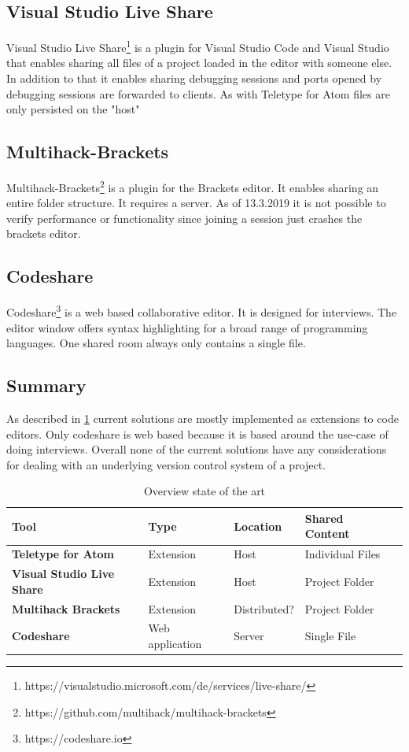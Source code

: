 \subsection{Visual Studio Live Share}
Visual Studio Live Share\footnote{https://visualstudio.microsoft.com/de/services/live-share/}  is a plugin for Visual Studio Code and Visual Studio that enables sharing all files of a project loaded in the editor with someone else. In addition to that it enables sharing debugging sessions and ports opened by debugging sessions are forwarded to clients. As with Teletype for Atom files are only persisted on the "host"  
\subsection{Multihack-Brackets}
Multihack-Brackets\footnote{https://github.com/multihack/multihack-brackets} is a plugin for the Brackets editor. It enables sharing an entire folder structure. It requires a server. As of 13.3.2019 it is not possible to verify performance or functionality since joining a session just crashes the brackets editor. 
\subsection{Codeshare}
Codeshare\footnote{https://codeshare.io} is a web based collaborative editor. It is designed for interviews. The editor window offers syntax highlighting for a broad range of programming languages. One shared room always only contains a single file. 
\subsection{Summary}
As described in \ref{tab:sota} current solutions are mostly implemented as extensions to code editors. Only codeshare is web based because it is based around the use-case of doing interviews. Overall none of the current solutions have any considerations for dealing with an underlying version control system of a project.

\begin{table}
	\centering
	\begin{tabular}{| >{\bfseries}l | l | l | l | l | }
		\hline
			\rowcolor{orange} \bfseries Tool & \bfseries Type & \bfseries Location & \bfseries Shared Content \\
		\hline
		\hline
			Teletype for Atom & Extension & Host & Individual Files \\\hline
			Visual Studio Live Share & Extension & Host & Project Folder \\\hline
			Multihack Brackets & Extension &  Distributed? & Project Folder \\\hline
			Codeshare & Web application & Server & Single File \\
		\hline
	\end{tabular}
	\caption{Overview state of the art}
	\label{tab:sota}
\end{table}

